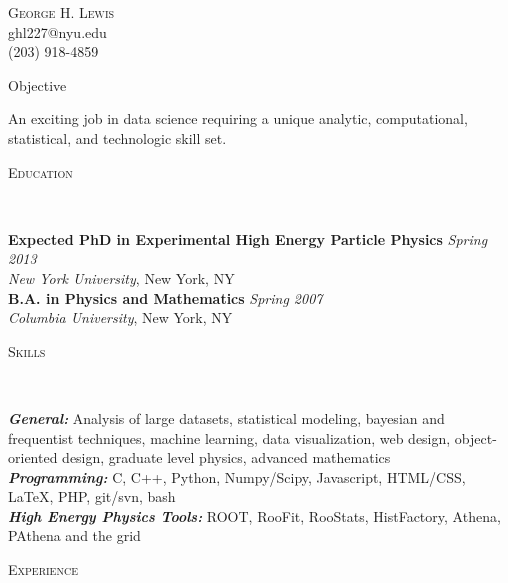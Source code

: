\documentclass[9pt]{article}
\newenvironment{changemargin}[2]{%
  \begin{list}{}{%
    \setlength{\topsep}{0pt}%
    \setlength{\leftmargin}{#1}%
    \setlength{\rightmargin}{#2}%
    \setlength{\listparindent}{\parindent}%
    \setlength{\itemindent}{\parindent}%
    \setlength{\parsep}{\parskip}%
  }%
  \item[]}{\end{list}
}
\newcommand{\lineover}{
	\begin{changemargin}{-0.05in}{-0.05in}
		\vspace*{-8pt}
		\hrulefill \\
		\vspace*{-2pt}
	\end{changemargin}
}
\newcommand{\header}[1]{
	\begin{changemargin}{-0.5in}{-0.5in}
		\scshape{#1}\\
  	\lineover
	\end{changemargin}
}
\newcommand{\contact}[4]{
	\begin{changemargin}{-0.5in}{-0.5in}
		\begin{center}
			{\Large \scshape {#1}}\\ \smallskip
			{#2}\\ \smallskip 
			{#3}\\ \smallskip
			{#4}\smallskip
		\end{center}
	\end{changemargin}
}
\newenvironment{body} {
	\vspace*{-16pt}
	\begin{changemargin}{-0.25in}{-0.5in}
  }	
	{\end{changemargin}
}
\begin{document}
\contact{George H. Lewis}{ghl227@nyu.edu}{(203) 918-4859}


\header{Objective}
\begin{body}
	\vspace{14pt}
	An exciting job in data science requiring a unique analytic, computational, statistical, and technologic skill set.
\end{body}

\smallskip


\header{Education}

\begin{body}
	\vspace{14pt}
	\textbf{Expected PhD in Experimental High Energy Particle Physics }{} \hfill \emph{Spring 2013}{} \\
	\emph{New York University}, New York, NY{} \\
  \medskip
	\textbf{B.A. in Physics and Mathematics} \hfill \emph{Spring 2007} \\
	\emph{Columbia University}, New York, NY\\
\end{body}

\smallskip


\header{Skills}

\begin{body}
	\vspace{14pt}
        \emph{\textbf{General:}}{} Analysis of large datasets, statistical modeling, bayesian and frequentist techniques, machine learning, data visualization, web design, object-oriented design, graduate level physics, advanced mathematics \\
        \smallskip
	\emph{\textbf{Programming:}}{} C, C++, Python, Numpy/Scipy, Javascript, HTML/CSS, \LaTeX, PHP, git/svn, bash \\
        \smallskip
	\emph{\textbf{High Energy Physics Tools:}}{} ROOT, RooFit, RooStats, HistFactory, Athena, PAthena and the grid \\
\end{body}

\smallskip

\header{Experience}
\end{document}
